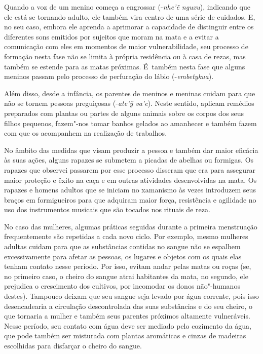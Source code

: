 Quando a voz de um menino começa a engrossar
(-\emph{nhe'ẽ nguxu}), indicando que ele está se
tornando adulto, ele também vira centro de uma série de cuidados. E, no
seu caso, embora ele aprenda a aprimorar a capacidade de distinguir
entre os diferentes sons emitidos por sujeitos que moram na mata e a
evitar a comunicação com eles em momentos de maior vulnerabilidade, seu
processo de formação nesta fase não se limita à própria residência ou à
casa de rezas, mas também se estende para as matas próximas. É~também
nesta fase que alguns meninos passam pelo processo de perfuração do
lábio (-\emph{embetykua}). 

Além disso, desde a infância, os parentes de meninos e meninas cuidam
para que não se tornem pessoas preguiçosas (-\emph{ate’ỹ va’e}). Neste
sentido, aplicam remédios preparados com plantas ou partes de alguns
animais sobre os corpos dos seus filhos pequenos, fazem"-nos tomar
banhos gelados ao amanhecer e também fazem com que os acompanhem na
realização de trabalhos.

No âmbito das medidas que visam produzir a pessoa e também dar maior
eficácia às suas ações, alguns rapazes se submetem a picadas de abelhas
ou formigas. Os rapazes que observei passarem por esse processo
disseram que era para assegurar maior proteção e êxito na caça e em
outras atividades desenvolvidas na mata. Os rapazes e homens adultos
que se iniciam no xamanismo às vezes introduzem seus braços em
formigueiros para que adquiram maior força, resistência e agilidade no
uso dos instrumentos musicais que são tocados nos rituais de reza. 

No caso das mulheres, algumas práticas seguidas durante a primeira
menstruação frequentemente são repetidas a cada novo ciclo. Por
exemplo, mesmo mulheres adultas cuidam para que as substâncias contidas
no sangue não se espalhem excessivamente para afetar as pessoas, os
lugares e objetos com os quais elas tenham contato nesse período. Por
isso, evitam andar pelas matas ou roças (se, no primeiro caso, o cheiro
do sangue atrai habitantes da mata, no segundo, ele prejudica o
crescimento dos cultivos, por incomodar os donos não"-humanos destes).
Tampouco deixam que seu sangue seja levado por água corrente, pois isso
desencadearia a circulação descontrolada das suas substâncias e do seu
cheiro, o que tornaria a mulher e também seus parentes próximos
altamente vulneráveis. Nesse período, seu contato com água deve ser
mediado pelo cozimento da água, que pode também ser misturada com
plantas aromáticas e cinzas de madeiras escolhidas para disfarçar o
cheiro do sangue.

